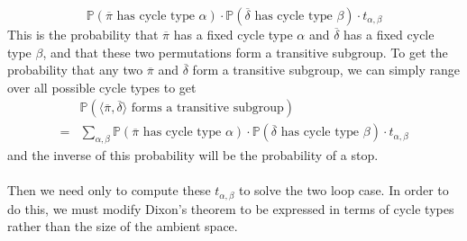 \[
	\mathbb{P}(\overline\pi\text{ has cycle type }\alpha)\cdot\mathbb{P}(\overline\delta\text{ has cycle type }\beta)\cdot t_{\alpha, \beta}
\]
This is the probability that $\overline\pi$ has a fixed cycle type $\alpha$ and $\overline\delta$ has a fixed cycle type $\beta$, and that these two permutations form a transitive subgroup. To get the probability that any two $\overline\pi$ and $\overline\delta$ form a transitive subgroup, we can simply range over all possible cycle types to get
\begin{align*}
	 & \mathbb{P}(\langle \overline\pi,\overline\delta \rangle\text{ forms a transitive subgroup})
	\\= &\sum_{\alpha, \beta}\mathbb{P}(\overline\pi\text{ has cycle type }\alpha)\cdot\mathbb{P}(\overline\delta\text{ has cycle type }\beta)\cdot t_{\alpha, \beta}
\end{align*}
and the inverse of this probability will be the probability of a stop. 
\\\\Then we need only to compute these $t_{\alpha, \beta}$ to solve the two loop case. In order to do this, we must modify Dixon's theorem to be expressed in terms of cycle types rather than the size of the ambient space.
